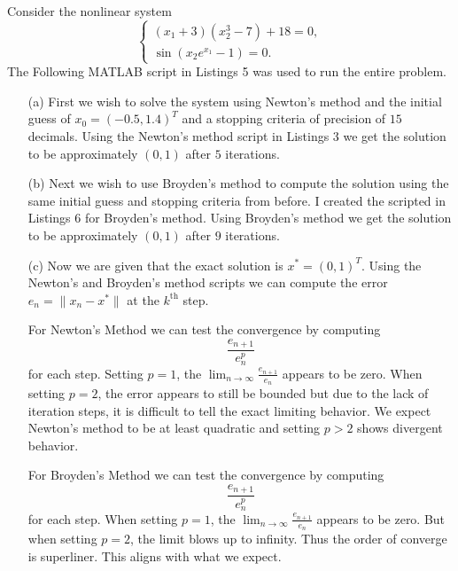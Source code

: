 \documentclass[12pt]{report}
\begin{document}
\begin{solution}

    \noindent
    Consider the nonlinear system
    \[ 
        \begin{cases}
            (x_1 + 3)(x_2^3 - 7) + 18 = 0,\\
            \sin(x_2e^{x_1} - 1) = 0.
        \end{cases}
    \]
    The Following MATLAB script in Listings 5 was used to run the entire problem.

    




    \begin{enumerate}
        \item [(a)]
        First we wish to solve the system using Newton's method and the initial guess of $x_0 = (-0.5,1.4)^T$ and a stopping criteria of precision of $15$ decimals. Using the Newton's method script in Listings 3 we get the solution to be approximately $(0,1)$ after $5$ iterations.  
        
        \item [(b)]
        Next we wish to use Broyden's method to compute the solution using the same initial guess and stopping criteria from before. I created the scripted in Listings 6 for Broyden's method. Using Broyden's method we get the solution to be approximately $(0,1)$ after $9$ iterations.
        
        



        \item [(c)]
        Now we are given that the exact solution is $x^* = (0,1)^T$. Using the Newton's and Broyden's method scripts we can compute the error $e_n = \|x_n - x^* \|$ at the $k^{\text{th}}$ step. 

        \noindent
        For Newton's Method we can test the convergence by computing
        \[
            \frac{e_{n+1}}{e_n^p}
        \] 
        for each step. Setting $p = 1$, the $\lim_{n \to \infty} \frac{e_{n+1}}{e_n}$ appears to be zero. When setting $p=2$, the error appears to still be bounded but due to the lack of iteration steps, it is difficult to tell the exact limiting behavior. We expect Newton's method to be at least quadratic and setting $p > 2$ shows divergent behavior. 


        \noindent
        For Broyden's Method we can test the convergence by computing
        \[
            \frac{e_{n+1}}{e_n^p}
        \] 
        for each step. When setting $p = 1$, the $\lim_{n \to \infty} \frac{e_{n+1}}{e_n}$ appears to be zero. But when setting $p=2$, the limit blows up to infinity. Thus the order of converge is superliner. This aligns with what we expect.



    \end{enumerate}


\end{solution}

\newpage
\end{document}
